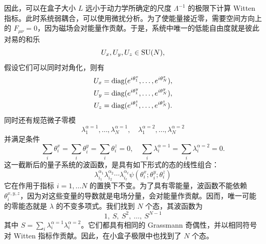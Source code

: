 因此，可以在盒子大小 $L$ 远小于动力学所确定的尺度 $\Lambda^{-1}$ 的极限下计算 Witten 指标。此时系统弱耦合，可以使用微扰分析。为了使能量接近零，需要空间方向上的 $F_{\mu\nu}=0$，因为磁场会对能量作贡献。于是，系统中唯一的低能自由度就是彼此对易的和乐
\begin{equation}
U_x, U_y, U_z \in \mathop{\mathrm{SU}}(N),
\end{equation}
假设它们可以同时对角化，则有
\begin{align}
U_x&=\mathop{\mathrm{diag}}(e^{i\theta^x_1},\ldots,e^{i\theta^x_N}),\\
U_y&=\mathop{\mathrm{diag}}(e^{i\theta^y_1},\ldots,e^{i\theta^y_N}),\\
U_z&=\mathop{\mathrm{diag}}(e^{i\theta^z_1},\ldots,e^{i\theta^z_N}).\label{Uxyz}
\end{align}
同时还有规范微子零模
\begin{equation}
\lambda^{\alpha=1}_1,\ldots,\lambda^{\alpha=1}_N,\quad
\lambda^{\alpha=2}_1,\ldots,\lambda^{\alpha=2}_N
\end{equation}
并满足条件
\begin{equation}
\sum_i \theta^x_i=\sum_i \theta^y_i=\sum_i \theta^z_i=0,\quad
\sum_i\lambda^{\alpha=1}_i=
\sum_i\lambda^{\alpha=2}_i=0.
\end{equation}
这一截断后的量子系统的波函数，是具有如下形式的态的线性组合：
\begin{equation}
\lambda^{\alpha_1}_{i_1}\lambda^{\alpha_2}_{i_2}\cdots \lambda^{\alpha_\ell}_{i_\ell}\psi(\theta^x_i;\theta^y_i;\theta^z_i)
\end{equation}
它在作用于指标 $i=1,\ldots N$ 的置换下不变。为了具有零能量，波函数不能依赖 $\theta^{x,y,z}_i$，因为对这些变量的导数就是电场分量，会对能量作贡献。因而，唯一可能的零能态就是 $\lambda$ 的不变多项式。我们找到 $N$ 个态，其波函数为
\begin{equation}
1,\ S,\ S^2,\ \ldots,\ S^{N-1}\label{tow}
\end{equation}
其中 $S=\sum_i\lambda^{\alpha=1}_i\lambda^{\alpha=2}_i$。它们都具有相同的 Grassmann 奇偶性，并以相同符号对 Witten 指标作贡献。因此，在小盒子极限中也找到了 $N$ 个态。

